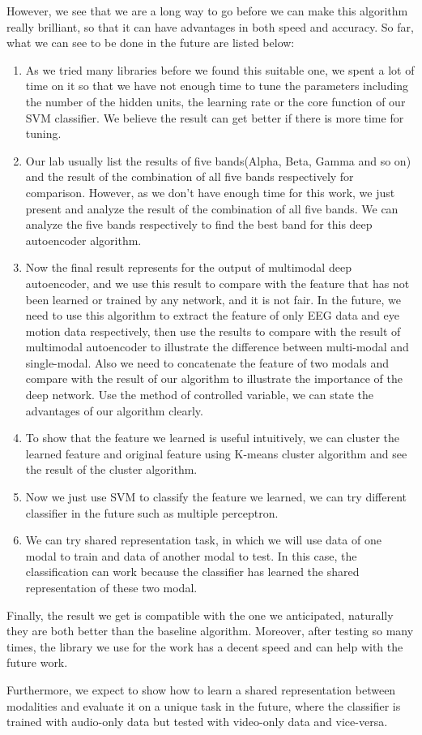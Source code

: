 \begin{bigabstract}
	However, we see that we are a long way to go before we can make this algorithm really brilliant, so that it can have advantages in both speed and accuracy. So far, what we can see to be done in the future are listed below:
\begin{enumerate}
\item As we tried many libraries before we found this suitable one, we spent a lot of time on it so that we have not enough time to tune the parameters including the number of the hidden units, the learning rate or the core function of our SVM classifier. We believe the result can get better if there is more time for tuning.
\item Our lab usually list the results of five bands(Alpha, Beta, Gamma and so on) and the result of the combination of all five bands respectively for comparison. However, as we don’t have enough time for this work, we just present and analyze the result of the combination of all five bands. We can analyze the five bands respectively to find the best band for this deep autoencoder algorithm.
\item Now the final result represents for the output of multimodal deep autoencoder, and we use this result to compare with the feature that has not been learned or trained by any network, and it is not fair.  In the future, we need to use this algorithm to extract the feature of only EEG data and eye motion data respectively, then use the results to compare with the result of multimodal autoencoder to illustrate the difference between multi-modal and single-modal. Also we need to concatenate the feature of two modals and compare with the result of our algorithm to illustrate the importance of the deep network. Use the method of controlled variable, we can state the advantages of our algorithm clearly.
\item To show that the feature we learned is useful intuitively, we can cluster the learned feature and original feature using K-means cluster algorithm and see the result of the cluster algorithm.
\item Now we just use SVM to classify the feature we learned, we can try different classifier in the future such as multiple perceptron.
\item We can try shared representation task, in which we will use data of one modal to train and data of another modal to test. In this case, the classification can work because the classifier has learned the shared representation of these two modal.
\end{enumerate}

	Finally, the result we get is compatible with the one we anticipated, naturally they are both better than the baseline algorithm. Moreover, after testing so many times, the library we use for the work has a decent speed and can help with the future work.

Furthermore, we expect to show how to learn a shared representation between modalities and evaluate it on a unique task in the future, where the classifier is trained with audio-only data but tested with video-only data and vice-versa. 


\end{bigabstract}